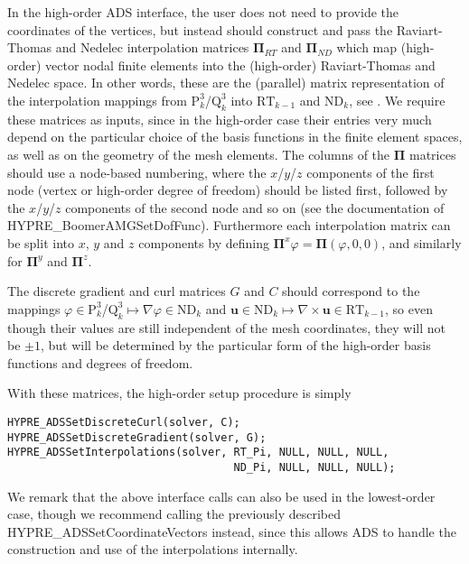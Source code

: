 In the high-order ADS interface, the user does not need to provide the
coordinates of the vertices, but instead should construct and pass the
Raviart-Thomas and Nedelec interpolation matrices ${\mathbf \Pi}_{RT}$ and
${\mathbf \Pi}_{ND}$ which map (high-order) vector nodal finite elements into
the (high-order) Raviart-Thomas and Nedelec space. In other words, these are the
(parallel) matrix representation of the interpolation mappings from
$\mathrm{P}_k^3$/$\mathrm{Q}_k^3$ into $\mathrm{RT}_{k-1}$ and $\mathrm{ND}_k$,
see \cite{xu_H_curl, ams_jcm}.  We require these matrices as inputs, since in
the high-order case their entries very much depend on the particular choice of
the basis functions in the finite element spaces, as well as on the geometry of
the mesh elements. The columns of the ${\mathbf \Pi}$ matrices should use a
node-based numbering, where the $x$/$y$/$z$ components of the first node (vertex
or high-order degree of freedom) should be listed first, followed by the
$x$/$y$/$z$ components of the second node and so on (see the documentation of
HYPRE\_BoomerAMGSetDofFunc). Furthermore each interpolation matrix can be split
into $x$, $y$ and $z$ components by defining ${\mathbf \Pi}^x \varphi = {\mathbf
\Pi} (\varphi,0,0)$, and similarly for ${\mathbf \Pi}^y$ and ${\mathbf
\Pi}^z$. 

The discrete gradient and curl matrices $G$ and $C$ should correspond to the
mappings $\varphi \in \mathrm{P}_k^3$/$\mathrm{Q}_k^3 \mapsto \nabla \varphi \in
\mathrm{ND}_k$ and ${\mathbf u} \in \mathrm{ND}_k \mapsto \nabla \times {\mathbf
  u} \in \mathrm{RT}_{k-1}$, so even though their values are still independent
of the mesh coordinates, they will not be $\pm 1$, but will be determined by the
particular form of the high-order basis functions and degrees of freedom.

With these matrices, the high-order setup procedure is simply
\begin{display}\begin{verbatim}
HYPRE_ADSSetDiscreteCurl(solver, C);
HYPRE_ADSSetDiscreteGradient(solver, G);
HYPRE_ADSSetInterpolations(solver, RT_Pi, NULL, NULL, NULL,
                                   ND_Pi, NULL, NULL, NULL);
\end{verbatim}\end{display}
We remark that the above interface calls can also be used in the lowest-order
case, though we recommend calling the previously described
HYPRE\_ADSSetCoordinateVectors instead, since this allows ADS to handle the
construction and use of the interpolations internally.


